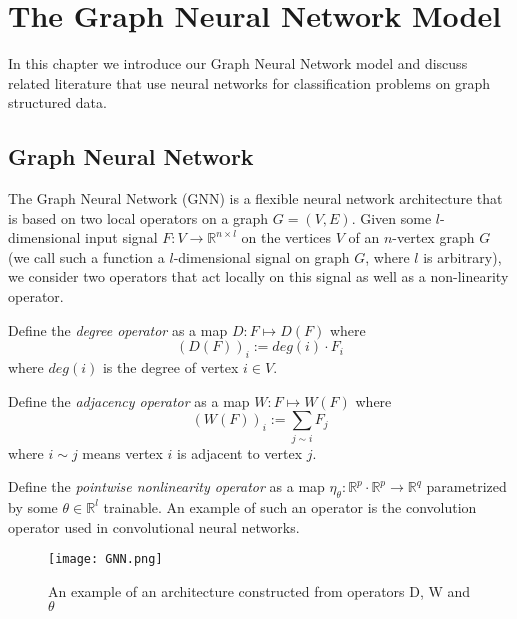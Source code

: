 \chapter{The Graph Neural Network Model}

In this chapter we introduce our Graph Neural Network model and discuss related literature that use neural networks for classification problems on graph structured data. 

\section{Graph Neural Network}

The Graph Neural Network (GNN) is a flexible neural network architecture that is based on two local operators on a graph $G = (V, E)$. Given some $l$-dimensional input signal $F :V \rightarrow \mathbb{R}^{n \times l}$ on the vertices $V$ of an $n$-vertex graph $G$ (we call such a function a $l$-dimensional signal on graph $G$, where $l$ is arbitrary), we consider two operators that act locally on this signal as well as a non-linearity operator.\\

\begin{definition}Define the \textit{degree operator} as a map $D : F \mapsto D(F)$ where $$(D(F))_i := deg(i) \cdot F_i$$  where $deg(i)$ is the degree of vertex $i \in V$.  
\end{definition}
\begin{definition}Define the \textit{adjacency operator} as a map $W: F \mapsto W(F)$ where $$(W(F))_i:= \sum_{j\sim i }F_j$$ where $i \sim j$ means vertex $i$ is adjacent to vertex $j$. 
\end{definition}

\begin{definition}Define the \textit{pointwise nonlinearity operator} as a map $\eta_{\theta}: \mathbb{R}^p \cdot \mathbb{R}^p \rightarrow \mathbb{R}^q$ parametrized by some $\theta \in \mathbb{R}^l$ trainable. An example of such an operator is the convolution operator used in convolutional neural networks.\\
\end{definition}

\begin{figure}
\begin{center}
  \texttt{[image: GNN.png]}
  \caption{An example of an architecture constructed from operators D, W and $\theta$}
  \label{fig:GNN}
 \end{center}
\end{figure}

